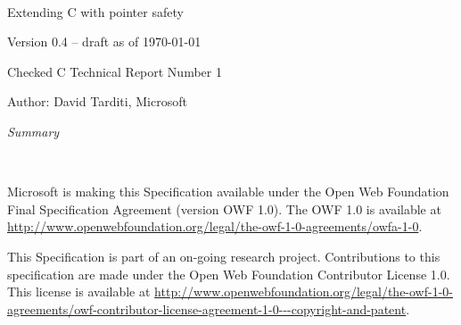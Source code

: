\documentclass[11pt]{report}
\begin{document}
\begin{titlepage}
{\center
\mbox{ }\\
\vspace{2in}
{\huge Extending C with pointer safety \par}
{Version 0.4 -- draft as of \today \par}
\vspace{0.5in}
{Checked C Technical Report Number 1 \par}
\vspace{0.25in}
{Author: David Tarditi, Microsoft\par} 
\vspace{1in}
{\it Summary \par}

}
\end{titlepage}

\thispagestyle{empty}
\mbox{  }\\
\vspace{1.0in}

Microsoft is making this Specification available under the Open Web
Foundation Final Specification Agreement (version OWF 1.0).  The OWF 1.0
is available at {\color{blue} \url{http://www.openwebfoundation.org/legal/the-owf-1-0-agreements/owfa-1-0}}.

This Specification is part of an on-going research project.
Contributions to this specification
are made under the Open Web Foundation Contributor License 1.0. 
This license is available at {\color{blue} \url{http://www.openwebfoundation.org/legal/the-owf-1-0-agreements/owf-contributor-license-agreement-1-0---copyright-and-patent}}.

\newpage

\setcounter{page}{1}

\tableofcontents

\setcounter{page}{1}














\nocite{Jones2009}
\nocite{Jim2002}



\appendix
% 
% 
\end{document}
